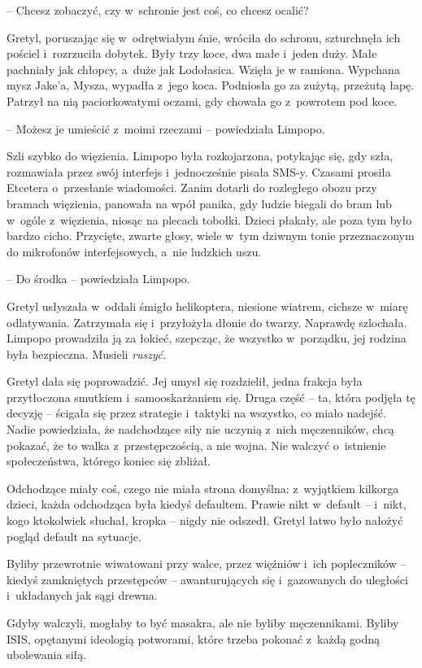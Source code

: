 \documentclass[oneside,polish,11pt,sfheadings]{mwbk}
\begin{document}
-- Chcesz zobaczyć, czy w~schronie jest coś, co chcesz ocalić?

Gretyl, poruszając się w~odrętwiałym śnie, wróciła do schronu,
szturchnęła ich pościel i~rozrzuciła dobytek. Były trzy koce, dwa małe i~jeden duży. Małe pachniały jak chłopcy, a~duże jak Lodołasica. Wzięła je
w ramiona. Wypchana mysz Jake'a, Mysza, wypadła z~jego koca. Podniosła
go za zużytą, przeżutą łapę. Patrzył na nią paciorkowatymi oczami, gdy
chowała go z~powrotem pod koce.

-- Możesz je umieścić z~moimi rzeczami -- powiedziała Limpopo.

Szli szybko do więzienia. Limpopo była rozkojarzona, potykając się, gdy
szła, rozmawiała przez swój interfejs i~jednocześnie pisała SMS-y.
Czasami prosiła Etcetera o~przesłanie wiadomości. Zanim dotarli do
rozległego obozu przy bramach więzienia, panowała na wpół panika, gdy
ludzie biegali do bram lub w~ogóle z~więzienia, niosąc na plecach
tobołki. Dzieci płakały, ale poza tym było bardzo cicho. Przycięte,
zwarte głosy, wiele w~tym dziwnym tonie przeznaczonym do mikrofonów
interfejsowych, a~nie ludzkich uszu.

-- Do środka -- powiedziała Limpopo. 

Gretyl usłyszała w~oddali śmigło
helikoptera, niesione wiatrem, cichsze w~miarę odlatywania. Zatrzymała
się i~przyłożyła dłonie do twarzy. Naprawdę szlochała. Limpopo
prowadziła ją za łokieć, szepcząc, że wszystko w~porządku, jej rodzina
była bezpieczna. Musieli \textit{ruszyć}.

Gretyl dała się poprowadzić. Jej umysł się rozdzielił, jedna frakcja
była przytłoczona smutkiem i~samooskarżaniem się. Druga część -- ta,
która podjęła tę decyzję -- ścigała się przez strategie i~taktyki na
wszystko, co miało nadejść. Nadie powiedziała, że nadchodzące siły nie
uczynią z~nich męczenników, chcą pokazać, że to walka z~przestępczością,
a nie wojna. Nie walczyć o~istnienie społeczeństwa, którego koniec się
zbliżał.

Odchodzące miały coś, czego nie miała strona domyślna: z~wyjątkiem
kilkorga dzieci, każda odchodząca była kiedyś defaultem. Prawie nikt w~default -- i~nikt, kogo ktokolwiek słuchał, kropka -- nigdy nie odszedł.
Gretyl łatwo było nałożyć pogląd default na sytuacje.

Byliby przewrotnie wiwatowani przy walce, przez więźniów i~ich
popleczników -- kiedyś zamkniętych przestępców -- awanturujących się i~gazowanych do uległości i~układanych jak sągi drewna.

Gdyby walczyli, mogłaby to być masakra, ale nie byliby męczennikami.
Byliby ISIS, opętanymi ideologią potworami, które trzeba pokonać z~każdą
godną ubolewania siłą.
\end{document}
